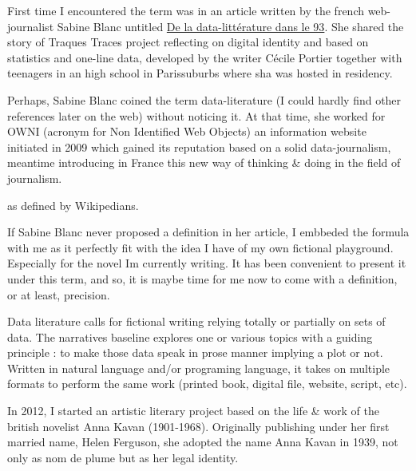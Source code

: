
First time I encountered the term was in an article written by the french web-journalist Sabine Blanc
untitled
{\textquotedbl}\href{http://owni.fr/2011/03/18/de-la-datalitterature-dans-le-9-3/}{De
la data-litt\'erature dans le 93}{\textquotedbl}. She shared the story
of {\textquotedbl}Traques Traces{\textquotedbl} project reflecting on
digital identity and based on statistics and one-line data, developed
by the writer C\'ecile Portier together with teenagers in an high
school in Paris{\textquotesingle}suburbs where sha was hosted in
residency.

Perhaps, Sabine Blanc coined the term data-literature (I could hardly
find other references later on the web) without noticing it. At that
time, she worked for OWNI (acronym for Non Identified Web Objects) an
information website initiated in 2009 which gained its reputation based
on a solid data-journalism, meantime introducing in France this new way
of thinking \& doing in the field of journalism.

\href{https://en.wikipedia.org/wiki/Data_journalism}{}
as defined by Wikipedians.~

If Sabine Blanc never proposed a definition in her article, I embbeded
the formula with me as it perfectly fit with the idea I have of my own
fictional playground. Especially for the novel I{\textquotesingle}m
currently writing. It has been convenient to present it under this
term, and so, it is maybe time for me now to come with a definition, or
at least, precision.

Data literature calls for fictional writing relying totally or partially
on sets of data. The narratives baseline explores one or various topics
with a guiding principle : to make those data speak in prose manner
implying a plot or not. Written in natural language and/or programing
language, it takes on multiple formats to perform the same work
(printed book, digital file, website, script, etc).

In 2012, I started an artistic literary project based on the life \&
work of the british novelist Anna Kavan (1901-1968). Originally
publishing under her first married name, Helen Ferguson, she adopted
the name Anna Kavan in 1939, not only as nom de plume but as her legal
identity.

